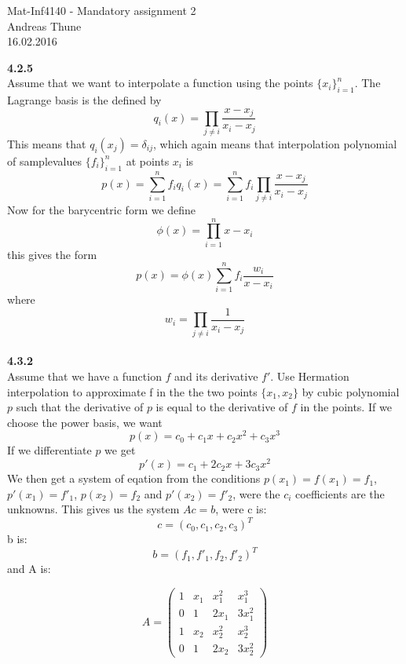 \documentclass[11pt,a4paper]{report}
\begin{document}
\begin{center}

\LARGE Mat-Inf4140 - Mandatory assignment 2
\\
Andreas Thune
\\
\LARGE
16.02.2016

\end{center}
\textbf{4.2.5}
\\
Assume that we want to interpolate a function using the points $\{ x_i\}_{i=1}^n$. The Lagrange basis is the defined by $$q_i(x) = \prod_{j\neq i} \frac{x-x_j}{x_i-x_j} $$ This means that $q_i(x_j) = \delta_{ij}$, which again means that interpolation polynomial of samplevalues $\{ f_i\}_{i=1}^n$ at points $x_i$ is $$p(x) = \sum_{i=1}^n f_iq_i(x)= \sum_{i=1}^n f_i\prod_{j\neq i} \frac{x-x_j}{x_i-x_j}$$ Now for the barycentric form we define $$\phi(x) = \prod_{i=1}^n x-x_i $$ this gives the form $$p(x) = \phi(x)\sum_{i=1}^n f_i\frac{w_i}{x-x_i}$$ where $$w_i = \prod_{j\neq i} \frac{1}{x_i-x_j}$$
\\
\textbf{4.3.2}
\\
Assume that we have a function $f$ and its derivative $f'$. Use Hermation interpolation to approximate f in the the two points $\{x_1,x_2\}$ by cubic polynomial $p$ such that the derivative of $p$ is equal to the derivative of $f$ in the points. If we choose the power basis, we want $$p(x)=c_0 + c_1x + c_2x^2 + c_3x^3$$ If we differentiate $p$ we get $$p'(x)=c_1 + 2c_2x + 3c_3x^2$$ We then get a system of eqation from the conditions $p(x_1)=f(x_1)=f_1$, $p'(x_1)=f'_1$, $p(x_2)=f_2$ and $p'(x_2)=f'_2$, were the $c_i$ coefficients are the unknowns. This gives us the system $Ac=b$, were c is: $$c=(c_0,c_1,c_2,c_3)^T$$ b is: $$b=(f_1,f'_1,f_2,f'_2)^T$$ and A is:  

$$ 
A = 
 \begin{pmatrix}
  1 & x_1 & x_1^2 &  x_1^3 \\
  0 & 1 & 2x_1 & 3x_1^2 \\
  1 & x_2 & x_2^2  & x_2^3  \\
  0 & 1 & 2x_2  & 3x_2^2 
 \end{pmatrix}
$$
\end{document}
